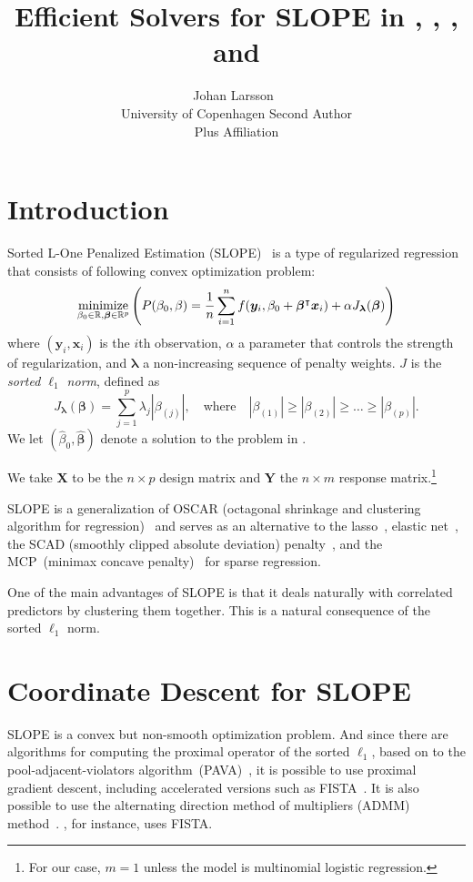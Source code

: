 \documentclass[article]{jss}
\author{Johan Larsson~\orcidlink{0000-0002-4029-5945}\\University of Copenhagen
   \And Second Author\\Plus Affiliation}
\title{Efficient Solvers for SLOPE in \proglang{R}, \proglang{Python}, \proglang{Julia}, and \proglang{C++}}
\let\Cref\crtCref
\begin{document}
\section{Introduction}

Sorted L-One Penalized Estimation
(SLOPE)~\citep{bogdan2013,zeng2014,bogdan2015} is a type of
regularized regression that consists of following convex optimization problem:
\begin{equation}
  \label{eq:slope}
  \operatorname*{minimize}_{\beta_0 \in \mathbb{R},\bm{\beta} \in \mathbb{R}^p} \left( P(\beta_0,\beta) =  \frac{1}{n} \sum_{i=1}^n f(\bm{y}_i, \beta_0 + \bm{\beta}^\intercal \bm{x}_i) + \alpha J_{\bm{\lambda}}(\bm{\beta})\right)
\end{equation}
where \((\bm{y}_i, \bm{x}_i)\) is the \(i\)th observation, \(\alpha\) a parameter
that controls the strength of regularization, and \(\bm{\lambda}\) a non-increasing sequence of penalty weights. \(J\) is the
\emph{sorted $\ell_1$ norm}, defined as
\begin{equation}
  \label{eq:sl1}
  J_{\bm{\lambda}}(\bm{\beta}) = \sum_{j=1}^p \lambda_j |\beta_{(j)}|, \quad
  \text{where}\quad |\beta_{(1)}| \geq |\beta_{(2)}| \geq \ldots \geq
  |\beta_{(p)}|.
\end{equation}
We let \((\hat{\beta}_0, \hat{\bm{\beta}})\) denote a solution to the problem in \Cref{eq:slope}.

We take \(\bm{X}\) to be the \(n \times p\) design matrix and \(\bm{Y}\) the
\(n \times m\) response matrix.\footnote{For our case, \(m = 1\) unless
  the model is multinomial logistic regression.}

SLOPE is a generalization of OSCAR (octagonal shrinkage and clustering
algorithm for regression)~\citep{bondell2008} and serves as an alternative to the
lasso~\citep{santosa1986,donoho1994,donoho1995,tibshirani1996}, elastic
net~\citep{zou2005}, the SCAD (smoothly clipped absolute deviation)
penalty~\citep{fan2001}, and the MCP~(minimax concave
penalty)~\citep{zhang2010} for sparse regression.

One of the main advantages of SLOPE is that it deals naturally with
correlated predictors by clustering them together. This is a natural
consequence of the sorted \(\ell_1\) norm.

\section{Coordinate Descent for SLOPE}

SLOPE is a convex but non-smooth optimization problem. And since there are
algorithms for computing the proximal operator of the sorted \(\ell_1\), based
on to the pool-adjacent-violators algorithm~(PAVA)~\citep{barlow1972}, it is
possible to use proximal gradient descent, including accelerated versions such
as FISTA~\citep{beck2009}. It is also possible to use the alternating direction
method of multipliers (ADMM) method~\citep{boyd2010}. \citet{bogdan2015}, for
instance, uses FISTA.
\end{document}
